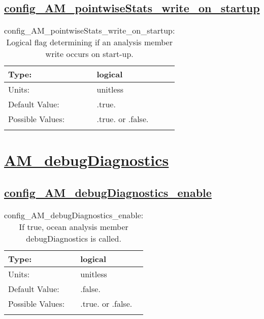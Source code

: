 \subsection[config\_AM\_pointwiseStats\_write\_on\_startup]{\hyperref[sec:nm_tab_AM_pointwiseStats]{config\_AM\_pointwiseStats\_write\_on\_startup}}
\label{subsec:nm_sec_config_AM_pointwiseStats_write_on_startup}
\begin{center}
\begin{longtable}{| p{2.0in} || p{4.0in} |}
    \hline
    Type: & logical \\
    \hline
    Units: & \si{unitless} \\
    \hline
    Default Value: & .true. \\
    \hline
    Possible Values: & .true. or .false. \\
    \hline
    \caption{config\_AM\_pointwiseStats\_write\_on\_startup: Logical flag determining if an analysis member write occurs on start-up.}
\end{longtable}
\end{center}
\section[AM\_debugDiagnostics]{\hyperref[sec:nm_tab_AM_debugDiagnostics]{AM\_debugDiagnostics}}
\label{sec:nm_sec_AM_debugDiagnostics}
\subsection[config\_AM\_debugDiagnostics\_enable]{\hyperref[sec:nm_tab_AM_debugDiagnostics]{config\_AM\_debugDiagnostics\_enable}}
\label{subsec:nm_sec_config_AM_debugDiagnostics_enable}
\begin{center}
\begin{longtable}{| p{2.0in} || p{4.0in} |}
    \hline
    Type: & logical \\
    \hline
    Units: & \si{unitless} \\
    \hline
    Default Value: & .false. \\
    \hline
    Possible Values: & .true. or .false. \\
    \hline
    \caption{config\_AM\_debugDiagnostics\_enable: If true, ocean analysis member debugDiagnostics is called.}
\end{longtable}
\end{center}

